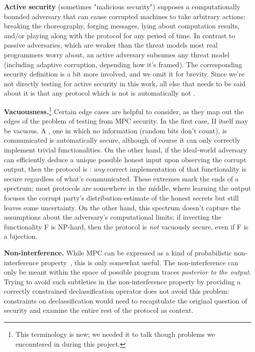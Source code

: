 \documentclass[compsoc, conference, a4paper, 10pt, times]{IEEEtran}
\renewcommand{\paragraph}[1]{\vspace*{2pt}\noindent\textbf{#1}}
\begin{document}
\textbf{Active security}
(sometimes "malicious security")
supposes a computationally bounded adversary that can cause corrupted machines to take arbitrary actions:
breaking the choreography,
forging messages,
lying about computation results,
and/or playing along with the protocol for any period of time.
In contrast to passive adversaries, which are weaker than the threat models most real programmers worry about,
an active adversary subsumes any threat model (including adaptive corruption, depending how it's framed).
The corresponding security definition is a bit more involved, and we omit it for brevity.
Since we're not directly testing for active security in this work,
all else that needs to be said about it is that
any protocol which is not  is automatically not .

\paragraph{Vacuousness.}\footnote{
    This terminology is new; we needed it to talk though problems we encountered in during this project.
}
Certain edge cases are helpful to consider, as they map out the edges of the problem of testing from MPC security.
In the first case, Π itself may be vacuous.
A , one in which no information (random bits don't count), is communicated is automatically secure,
although of course it can only correctly implement trivial functionalities.
On the other hand, if the ideal-world adversary can efficiently deduce a unique possible honest input upon observing the corrupt output,
then the protocol is : \textit{any} correct implementation of that functionality is secure regardless of what's communicated.
These extremes mark the ends of a spectrum; most protocols are somewhere in the middle,
where learning the output focuses the corrupt party's distribution-estimate of the honest secrets but still leaves some uncertainty.
On the other hand, this spectrum doesn't capture the assumptions about the adversary's computational limits;
if inverting the functionality F is NP-hard, then the protocol is \textit{not} vacuously secure, even if F is a bijection.

\paragraph{Non-interference.}
While MPC can be expressed as a kind of probabilistic non-interference property~\cite{haagh2018computer, almeida2018enforcing}, this is only somewhat useful.
The non-interference can only be meant within the space of possible program traces \textit{posterior to the output}.
Trying to avoid such subtleties in the non-interference property by providing a correctly constrained declassification operator
does not avoid this problem: constraints on declassification would need to recapitulate the original question of security
and examine the entire rest of the protocol as context.
\end{document}
